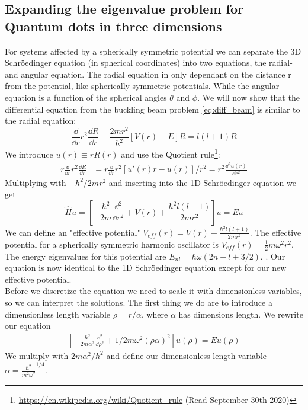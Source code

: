\documentclass[american,a4paper,12pt]{article}
\begin{document}
\subsection{Expanding the eigenvalue problem for Quantum dots in three dimensions}
For systems affected by a spherically symmetric potential we can separate the 3D Schröedinger equation (in spherical coordinates) into two equations, the radial- and angular equation. The radial equation in only dependant on the distance r from the potential, like spherically symmetric potentials. While the angular equation is a function of the spherical angles $\theta$ and $\phi$. We will now show that the differential equation from the buckling beam problem \ref{eq:diff_beam} is similar to the radial equation:
\begin{equation}
    \frac{\dd}{\dd r} r^2 \frac{\dd R}{\dd r} - \frac{2mr^2}{\hbar^2} [V(r)-E]R = l(l+1)R
    \label{eq:radial}
\end{equation}
We introduce $u(r) \equiv rR(r)$ and use the Quotient rule\footnote{\url{https://en.wikipedia.org/wiki/Quotient_rule} (Read September 30th 2020)}:
\begin{align*}
    r\frac{\dd}{\dd r} r^2 \frac{\dd R}{\dd r} &= r \frac{\dd}{\dd r} r^2 [u'(r)r -u(r)]/r^2 = r^2\frac{\dd^2 u(r)}{\dd r^2}
\end{align*}
Multiplying with $-\hbar^2/2mr^2$ and inserting into the 1D Schröedinger equation we get
\begin{equation}
    \hat H u = \left[ -\frac{\hbar^2}{2m} \frac{\dd^2}{\dd r^2} + V(r) + \frac{\hbar^2 l(l+1)}{2m r^2}\right] u = E u
    \label{eq:schrodinger}
\end{equation}
We can define an "effective potential" $V_{eff}(r) =V(r) + \frac{\hbar^2 l(l+1)}{2m r^2}$. The effective potential for a spherically symmetric harmonic oscillator is $V_{eff}(r)=\frac{1}{2}m\omega^2 r^2$. The energy eigenvalues for this potential are $E_{nl}=\hbar\omega (2n+l+3/2)$.  \cite{project_description}.
Our equation is now identical to the 1D Schröedinger equation except for our new effective potential.\\
Before we discretize the equation we need to scale it with dimensionless variables, so we can interpret the solutions. The first thing we do are to introduce a dimensionless length variable $\rho = r/\alpha$, where $\alpha$ has dimensions length. We rewrite our equation
\begin{align*}
    \left[ -\frac{\hbar^2}{2m\alpha^2} \frac{\dd^2}{\dd \rho^2} + 1/2 m\omega^2(\rho \alpha)^2 \right] u(\rho) = E u(\rho)
\end{align*}
We multiply with $2m\alpha^2/\hbar^2$ and define our dimensionless length variable $\alpha=\frac{\hbar^2}{m^2 \omega^2} ^{1/4}$.
\end{document}
